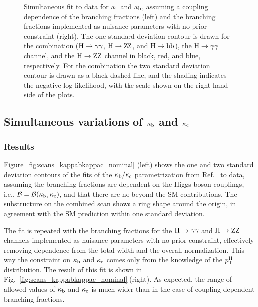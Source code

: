 \begin{figure}[hbtp]
\begin{center}
{        }
    \caption{
        Simultaneous fit to data for $\kappa_{\mathrm{t}}$ and $\kappa_{\mathrm{b}}$, assuming a coupling dependence of the branching fractions (left) and the branching fractions implemented as nuisance parameters with no prior constraint (right).
        The one standard deviation contour is drawn for the combination ($\mathrm{H}\to\mathrm{\gamma}\mathrm{\gamma}$, $\mathrm{H}\to\mathrm{Z}\mathrm{Z}$, and $\mathrm{H}\to\mathrm{b}\bar{\mathrm{b}}$), the $\mathrm{H}\to\mathrm{\gamma}\mathrm{\gamma}$ channel, and the $\mathrm{H}\to\mathrm{Z}\mathrm{Z}$ channel in black, red, and blue, respectively.
        For the combination the two standard deviation contour is drawn as a black dashed line, and the shading indicates the negative log-likelihood, with the scale shown on the right hand side of the plots.
        }
    \label{fig:scans_kappatkappab_rawInput}
  \end{center}
\end{figure}





\subsection{Simultaneous variations of \texorpdfstring{$\kappa_{\mathrm{b}}$}{kb} and \texorpdfstring{$\kappa_{\mathrm{c}}$}{kc}}


\subsubsection{Results}


Figure~\ref{fig:scans_kappabkappac_nominal} (left) shows the one and two standard deviation contours of the fits of the $\kappa_{\mathrm{b}}/\kappa_{\mathrm{c}}$ parametrization from Ref.~\cite{Bishara:2016jga} to data, assuming the branching fractions are dependent on the Higgs boson couplings, i.e., $\mathcal{B} = \mathcal{B}(\kappa_{\mathrm{b}}, \kappa_{\mathrm{c}})$, and that there are no beyond-the-SM contributions.
% 
The substructure on the combined scan shows a ring shape around the origin, in agreement with the SM prediction within one standard deviation.


The fit is repeated with the branching fractions for the $\mathrm{H}\to\mathrm{\gamma}\mathrm{\gamma}$ and $\mathrm{H}\to\mathrm{Z}\mathrm{Z}$ channels implemented as nuisance parameters with no prior constraint, effectively removing dependence from the total width and the overall normalization.
% 
This way the constraint on $\kappa_{\mathrm{b}}$ and $\kappa_{\mathrm{c}}$ comes only from the knowledge of the $p_\mathrm{T}^\mathrm{H}$ distribution.
% 
The result of this fit is shown in Fig.~\ref{fig:scans_kappabkappac_nominal} (right).
% 
As expected, the range of allowed values of $\kappa_{\mathrm{b}}$ and $\kappa_{\mathrm{c}}$ is much wider than in the case of coupling-dependent branching fractions.


